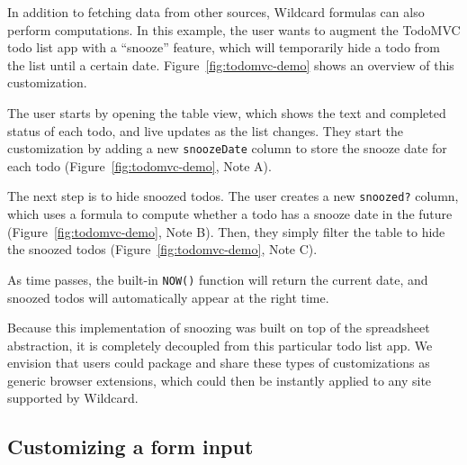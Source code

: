 \documentclass[english,submission]{programming}
\begin{document}
In addition to fetching data from other sources, Wildcard formulas can
also perform computations. In this example, the user wants to augment
the TodoMVC todo list app with a ``snooze'' feature, which will
temporarily hide a todo from the list until a certain date.{
Figure~\ref{fig:todomvc-demo} shows an overview of this customization.}

The user starts by opening the table view, which shows the text and
completed status of each todo, and live updates as the list changes.
They start the customization by adding a new \texttt{snoozeDate} column
to store the snooze date for each todo{ (Figure~\ref{fig:todomvc-demo},
Note A)}.

The next step is to hide snoozed todos. The user creates a new
\texttt{snoozed?} column, which uses a formula to compute whether a todo
has a snooze date in the future{ (Figure~\ref{fig:todomvc-demo}, Note
B)}. Then, they simply filter the table to hide the snoozed todos{
(Figure~\ref{fig:todomvc-demo}, Note C)}.

As time passes, the built-in \texttt{NOW()} function will return the
current date, and snoozed todos will automatically appear at the right
time.

Because this implementation of snoozing was built on top of the
spreadsheet abstraction, it is completely decoupled from this particular
todo list app. We envision that users could package and share these
types of customizations as generic browser extensions, which could then
be instantly applied to any site supported by Wildcard.

\hypertarget{customizing-a-form-input}{%
\subsection{Customizing a form input}\label{customizing-a-form-input}}
\end{document}
